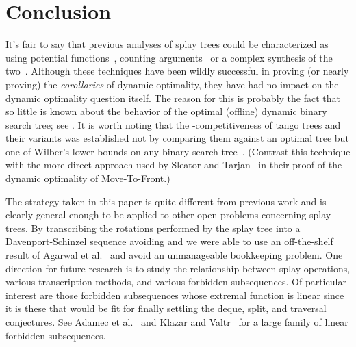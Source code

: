 \documentclass{article}
\begin{document}
\section{Conclusion}\label{sect:conclusion}

It's fair to say that previous analyses of splay trees could be characterized
as using potential functions~\cite{ST85,Georg04}, counting 
arguments~\cite{Tar85,Lucas91,Sundar92,Elmasry04b} or a complex synthesis 
of the two~\cite{ColeEtal00,Cole00}.  Although these techniques have been wildly successful
in proving (or nearly proving) the {\em corollaries} of dynamic optimality,
they have had no impact on the dynamic optimality question itself.  
The reason for this is probably the fact that so little is known about the behavior
of the optimal (offline) dynamic binary search tree; see \cite{Lucas88,BCK03}.
It is worth noting that the -competitiveness of tango trees and their
variants \cite{DHIP04,WDS06,Georg05} was established not by comparing them against
an optimal tree but one of Wilber's lower bounds on any binary search tree~\cite{Wilber89}.
(Contrast this technique with the more direct approach used by Sleator and Tarjan~\cite{ST85b}
in their proof of the dynamic optimality of Move-To-Front.)

The strategy taken in this paper is quite different from previous work and is clearly general
enough to be applied to other open problems concerning splay trees.
By transcribing the rotations performed by the splay tree into a Davenport-Schinzel sequence
avoiding  and  we were able to use an off-the-shelf result of Agarwal et al.~\cite{ASS89}
and avoid an unmanageable bookkeeping problem.
One direction for future research is to study the relationship between splay operations,
various transcription methods, and various forbidden subsequences.  
Of particular interest are those forbidden subsequences whose extremal function is linear
since it is these that would be fit for finally settling the deque, split, and traversal conjectures.
See Adamec et al.~\cite{AKV92} and Klazar and Valtr~\cite{KV94}  for a large family of 
linear forbidden subsequences.

{\small


}
\end{document}
